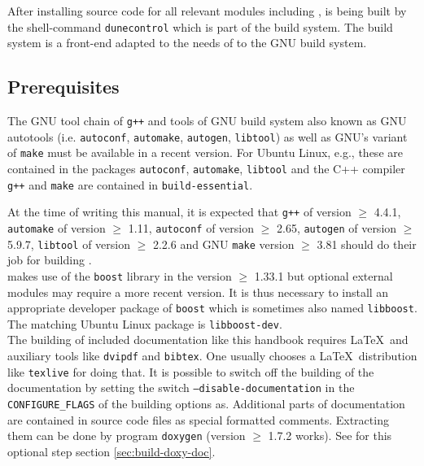 After installing source code for all relevant \Dune modules including \Dumux, \Dune is being built by the shell-command \texttt{dunecontrol} which is part of the \Dune build system. The \Dune build system is a front-end adapted to the needs of \Dune to the GNU build system.

\subsection{Prerequisites} \label{sec:prerequisites}
The GNU tool chain of \texttt{g++}  and tools of GNU build system \cite{GNU-BS} also known as GNU autotools
(i.e. \texttt{autoconf}, \texttt{automake}, \texttt{autogen}, \texttt{libtool}) as well as GNU's variant of \texttt{make}
must be available in a recent version. For Ubuntu Linux, e.g.,  these are contained in the
packages \texttt{autoconf}, \texttt{automake}, \texttt{libtool}
and the C++ compiler \texttt{g++} and \texttt{make} are contained in \texttt{build-essential}.

At the time of writing this manual, it is expected that \texttt{g++} of version $\geqslant$ 4.4.1, \texttt{automake} of version $\geqslant$ 1.11,
\texttt{autoconf} of version $\geqslant$ 2.65, \texttt{autogen} of version $\geqslant$ 5.9.7,  \texttt{libtool} of version $\geqslant$ 2.2.6
and GNU \texttt{make} version $\geqslant$ 3.81 should do their job for building \Dumux.\\

\Dumux makes use of the \texttt{boost} library in the version $\geqslant$ 1.33.1 but optional external modules may require a more recent version. 
It is thus necessary to install an appropriate developer package of \texttt{boost}
which is sometimes also named \texttt{libboost}. The matching Ubuntu Linux package is \texttt{libboost-dev}. \\

The building of included documentation like this handbook requires \LaTeX\  and auxiliary tools
like \texttt{dvipdf} and \texttt{bibtex}. One usually chooses a \LaTeX\  distribution like \texttt{texlive} for doing that.
It is possible to switch off the building of the documentation by setting the switch \texttt{--disable-documentation} in the \texttt{CONFIGURE\_FLAGS} of the building options as.
Additional parts of documentation are contained in source code files as special formatted comments.
Extracting them can be done by program \texttt{doxygen} (version $\geqslant$ 1.7.2 works). See for this optional step section \ref{sec:build-doxy-doc}.\\

